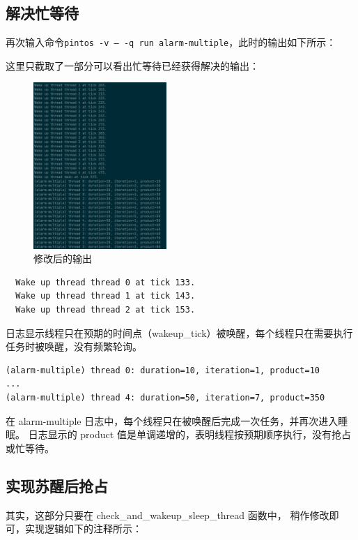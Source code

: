 \subsection{解决忙等待}

再次输入命令\texttt{pintos -v -- -q run alarm-multiple}，此时的输出如下所示：

这里只截取了一部分可以看出忙等待已经获得解决的输出：

\begin{figure}[H]
  \centering
  \includegraphics[width=0.45\textwidth]{img4/output.png}
  \caption{修改后的输出}
  \label{fig:pintos}
\end{figure}

\begin{lstlisting}
  Wake up thread thread 0 at tick 133.
  Wake up thread thread 1 at tick 143.
  Wake up thread thread 2 at tick 153.
\end{lstlisting}

日志显示线程只在预期的时间点（wakeup\_tick）被唤醒，每个线程只在需要执行任务时被唤醒，没有频繁轮询。

\begin{lstlisting}
(alarm-multiple) thread 0: duration=10, iteration=1, product=10
...
(alarm-multiple) thread 4: duration=50, iteration=7, product=350
\end{lstlisting}

在 alarm-multiple 日志中，每个线程只在被唤醒后完成一次任务，并再次进入睡眠。
日志显示的 product 值是单调递增的，表明线程按预期顺序执行，没有抢占或忙等待。

\subsection{实现苏醒后抢占}

其实，这部分只要在 check\_and\_wakeup\_sleep\_thread 函数中，
稍作修改即可，实现逻辑如下的注释所示：

